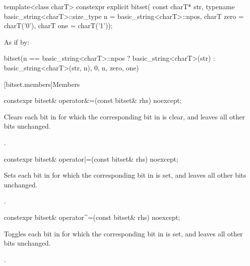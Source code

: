 %
\begin{itemdecl}
template<class charT>
  constexpr explicit bitset(
    const charT* str,
    typename basic_string<charT>::size_type n = basic_string<charT>::npos,
    charT zero = charT('0'),
    charT one = charT('1'));
\end{itemdecl}

\begin{itemdescr}
\pnum
\effects
As if by:
\begin{codeblock}
bitset(n == basic_string<charT>::npos
          ? basic_string<charT>(str)
          : basic_string<charT>(str, n),
       0, n, zero, one)
\end{codeblock}
\end{itemdescr}


[bitset.members]{Members}

%
\begin{itemdecl}
constexpr bitset& operator&=(const bitset& rhs) noexcept;
\end{itemdecl}

\begin{itemdescr}
\pnum
\effects
Clears each bit in
for which the corresponding bit in  is clear, and leaves all other bits unchanged.

\pnum
\returns
{}.
\end{itemdescr}

%
\begin{itemdecl}
constexpr bitset& operator|=(const bitset& rhs) noexcept;
\end{itemdecl}

\begin{itemdescr}
\pnum
\effects
Sets each bit in
for which the corresponding bit in  is set, and leaves all other bits unchanged.

\pnum
\returns
{}.
\end{itemdescr}

%
\begin{itemdecl}
constexpr bitset& operator^=(const bitset& rhs) noexcept;
\end{itemdecl}

\begin{itemdescr}
\pnum
\effects
Toggles each bit in
for which the corresponding bit in  is set, and leaves all other bits unchanged.

\pnum
\returns
{}.
\end{itemdescr}

